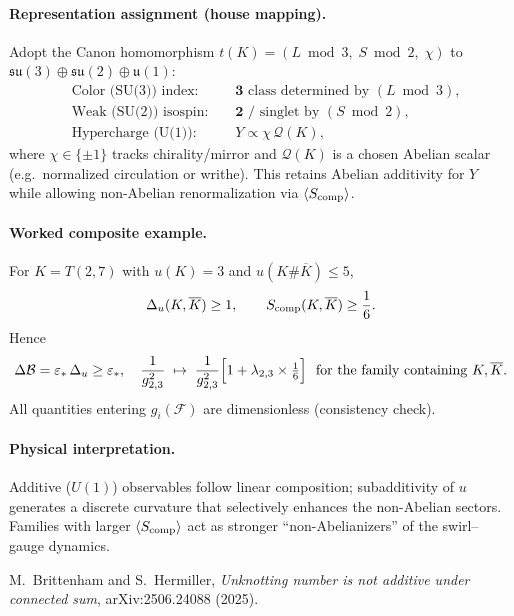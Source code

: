 \documentclass[11pt]{article}
\begin{document}
\paragraph{Representation assignment (house mapping).}
    Adopt the Canon homomorphism \(t(K)=(L \bmod 3,\;S \bmod 2,\;\chi)\) to \(\mathfrak{su}(3)\oplus\mathfrak{su}(2)\oplus\mathfrak u(1)\):
    \[
        \begin{aligned}
        &\text{Color (SU(3)) index: } &&\mathbf 3 \text{ class determined by } (L \bmod 3),\\
        &\text{Weak (SU(2)) isospin: } &&\mathbf 2 \text{ / singlet by } (S \bmod 2),\\
        &\text{Hypercharge (U(1)): } &&Y\propto \chi\, \mathcal Q(K),
        \end{aligned}
    \]
    where \(\chi\in\{\pm1\}\) tracks chirality/mirror and \(\mathcal Q(K)\) is a chosen Abelian scalar (e.g.\ normalized circulation or writhe). This retains Abelian additivity for \(Y\) while allowing non-Abelian renormalization via \(\langle S_{\rm comp}\rangle\).

\paragraph{Worked composite example.}
    For \(K=T(2,7)\) with \(u(K)=3\) and \(u(K\#\overline K)\le 5\),
    \[
        \Delta_u(K,\overline K)\ge 1,\qquad
        S_{\rm comp}(K,\overline K)\ge \frac{1}{6}.
    \]
    Hence
    \[
        \Delta\mathcal B=\varepsilon_*\,\Delta_u\ge \varepsilon_*,
        \quad
        \frac{1}{g_{2,3}^2}\;\mapsto\;\frac{1}{g_{2,3}^2}\Bigl[1+\lambda_{2,3}\times\tfrac{1}{6}\Bigr]
        \ \ \text{for the family containing }K,\overline K.
    \]
    All quantities entering \(g_i(\mathcal F)\) are dimensionless (consistency check).

\paragraph{Physical interpretation.}
    Additive (\(U(1)\)) observables follow linear composition; subadditivity of \(u\) generates a discrete curvature that selectively enhances the non-Abelian sectors. Families with larger \(\langle S_{\rm comp}\rangle\) act as stronger “non-Abelianizers” of the swirl–gauge dynamics.

    \begin{thebibliography}{9}
    M.~Brittenham and S.~Hermiller,
    \emph{Unknotting number is not additive under connected sum},
    arXiv:2506.24088 (2025).
    \end{thebibliography}
\end{document}
